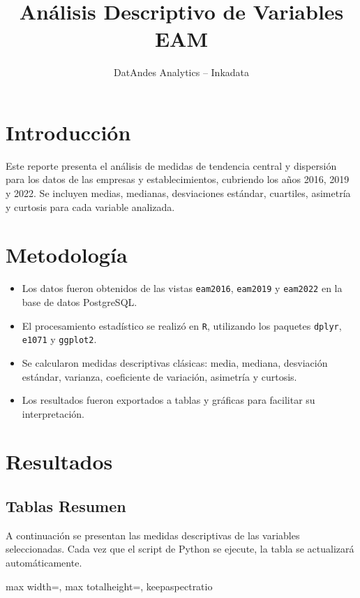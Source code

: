 \documentclass[a4paper, 12pt]{article}
\title{Análisis Descriptivo de Variables EAM}
\author{DatAndes Analytics -- Inkadata}
\begin{document}
\maketitle
\tableofcontents
\newpage

\section{Introducción}
Este reporte presenta el análisis de medidas de tendencia central y dispersión para los datos de las empresas y establecimientos, cubriendo los años 2016, 2019 y 2022. 
Se incluyen medias, medianas, desviaciones estándar, cuartiles, asimetría y curtosis para cada variable analizada.

\section{Metodología}
\begin{itemize}
    \item Los datos fueron obtenidos de las vistas \texttt{eam2016}, \texttt{eam2019} y \texttt{eam2022} en la base de datos PostgreSQL.
    \item El procesamiento estadístico se realizó en \texttt{R}, utilizando los paquetes \texttt{dplyr}, \texttt{e1071} y \texttt{ggplot2}.
    \item Se calcularon medidas descriptivas clásicas: media, mediana, desviación estándar, varianza, coeficiente de variación, asimetría y curtosis.
    \item Los resultados fueron exportados a tablas y gráficas para facilitar su interpretación.
\end{itemize}

\section{Resultados}

\subsection{Tablas Resumen}
A continuación se presentan las medidas descriptivas de las variables seleccionadas.  
Cada vez que el script de Python se ejecute, la tabla se actualizará automáticamente.

\begin{landscape}
\begin{table}[htbp]
    \centering
    \begin{adjustbox}{max width=\textwidth, max totalheight=\textheight, keepaspectratio}
    
    \end{adjustbox}
    \caption{Medidas de tendencia y dispersión por variable}
\end{table}
\end{landscape}
\restoregeometry
\end{document}
